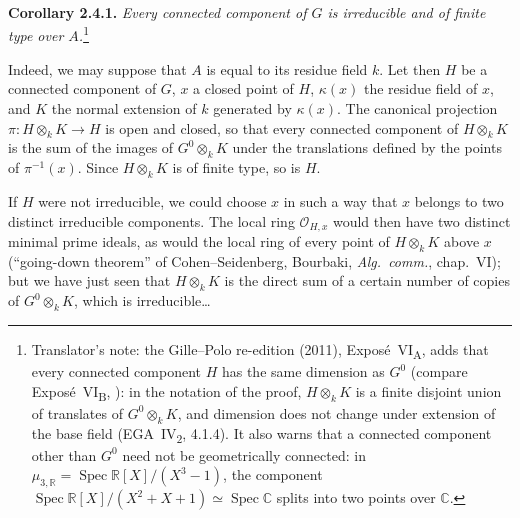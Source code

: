 \medskip
{}\label{cor:sga3-VIA-2.4.1}%
\noindent\textbf{Corollary 2.4.1.}
\textit{Every connected component of \(G\) is irreducible and of finite
type over \(A\).}\footnote{Translator's note: the Gille--Polo re-edition (2011),
Exposé~VI\textsubscript{A}, adds that every connected component \(H\) has the same dimension as
\(G^0\) (compare Exposé~VI\textsubscript{B}, ): in the notation of
the proof, \(H\otimes_kK\) is a finite disjoint union of translates of \(G^0\otimes_kK\), and
dimension does not change under extension of the base field (EGA~IV\textsubscript{2}, 4.1.4). It also
warns that a connected component other than \(G^0\) need not be geometrically connected: in
\(\mu_{3,\mathbb R}=\operatorname{Spec}\mathbb R[X]/(X^3-1)\), the component
\(\operatorname{Spec}\mathbb R[X]/(X^2+X+1)\simeq\operatorname{Spec}\mathbb C\) splits into two
points over \(\mathbb C\).}

\medskip
Indeed, we may suppose that \(A\) is equal to its residue field \(k\).
Let then \(H\) be a connected component of \(G\), \(x\) a closed point of
\(H\), \(\kappa(x)\) the residue field of \(x\), and \(K\) the normal
extension of \(k\) generated by \(\kappa(x)\). The canonical projection
\(\pi:H\otimes_kK\to H\) is open and closed, so that every connected
component of \(H\otimes_kK\) is the sum of the images of
\(G^0\otimes_kK\) under the translations defined by the points of
\(\pi^{-1}(x)\). Since \(H\otimes_kK\) is of finite type, so is \(H\).

If \(H\) were not irreducible, we could choose \(x\) in such a way that
\(x\) belongs to two distinct irreducible components. The local ring
\(\mathcal O_{H,x}\) would then have two distinct minimal prime ideals,
as would the local ring of every point of \(H\otimes_kK\) above \(x\)
(``going-down theorem'' of Cohen--Seidenberg, Bourbaki,
\emph{Alg.\ comm.}, chap.~VI); but we have just seen that
\(H\otimes_kK\) is the direct sum of a certain number of copies of
\(G^0\otimes_kK\), which is irreducible\ldots

